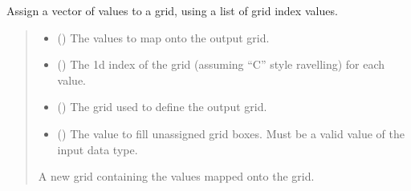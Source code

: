 \documentclass[letterpaper,10pt,english]{sphinxmanual}
\begin{document}
\begin{fulllineitems}
\label{\detokenize{kriging:glomar_gridding.grid.assign_to_grid}}
\pysigstartsignatures
\pysiglinewithargsret
{}
{\sphinxparamcomma {}\sphinxparamcomma {}\sphinxparamcomma {}}
{}
\pysigstopsignatures
\sphinxAtStartPar
Assign a vector of values to a grid, using a list of grid index values.
\begin{quote}\begin{description}
\begin{itemize}
\item {}
\sphinxAtStartPar
{} () \textendash{} The values to map onto the output grid.

\item {}
\sphinxAtStartPar
{} () \textendash{} The 1d index of the grid (assuming “C” style ravelling) for each value.

\item {}
\sphinxAtStartPar
{} () \textendash{} The grid used to define the output grid.

\item {}
\sphinxAtStartPar
{} () \textendash{} The value to fill unassigned grid boxes. Must be a valid value of the
input  data type.

\end{itemize}

\sphinxAtStartPar
{} \textendash{} A new grid containing the values mapped onto the grid.

\sphinxAtStartPar
{}

\end{description}\end{quote}

\end{fulllineitems}
\end{document}
